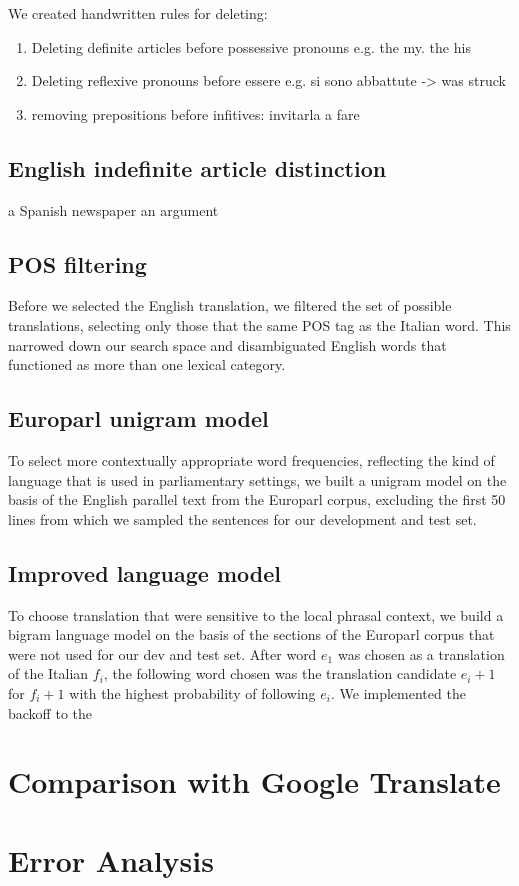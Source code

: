 \documentclass{article}
\begin{document}
We created handwritten rules for deleting:

\begin{enumerate}
	\item Deleting definite articles before possessive pronouns e.g. the my. the his
	\item Deleting reflexive pronouns before essere e.g. si sono abbattute -> was struck
	\item removing prepositions before infitives: invitarla a fare
\end{enumerate}

\subsection{English indefinite article distinction}

a Spanish newspaper
an argument

\subsection{POS filtering}

Before we selected the English translation, we filtered the set of possible translations, selecting only those that the same POS tag as the Italian word. This narrowed down our search space and disambiguated English words that functioned as more than one lexical category. 

\subsection{Europarl unigram model}

To select more contextually appropriate word frequencies, reflecting the kind of language that is used in parliamentary settings, we built a unigram model on the basis of the English parallel text from the Europarl corpus, excluding the first 50 lines from which we sampled the sentences for our development and test set. \\
 
\subsection{Improved language model}

To choose translation that were sensitive to the local phrasal context, we build a bigram language model on the basis of the sections of the Europarl corpus that were not used for our dev and test set. After word $e_1$ was chosen as a translation of the Italian $f_i$, the following word chosen was the translation candidate $e_i+1$ for $f_i+1$ with the highest probability of following $e_i$. We implemented the backoff to the 


\section{Comparison with Google Translate}

\section{Error Analysis}
\end{document}

